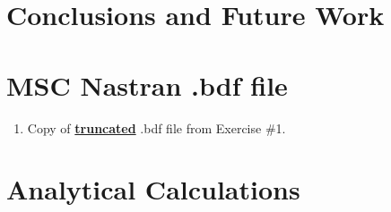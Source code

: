 \documentclass[11pt,a4paper,oneside]{memoir}
\begin{document}
\chapter{Conclusions and Future Work}


\appendix

\chapter{MSC Nastran .bdf file}\label{chap:a}
\begin{enumerate}
	\item Copy of \underline{\textbf{truncated}} .bdf file from Exercise \#1.
\end{enumerate}

\chapter{Analytical Calculations}\label{chap:b}



\end{document}
